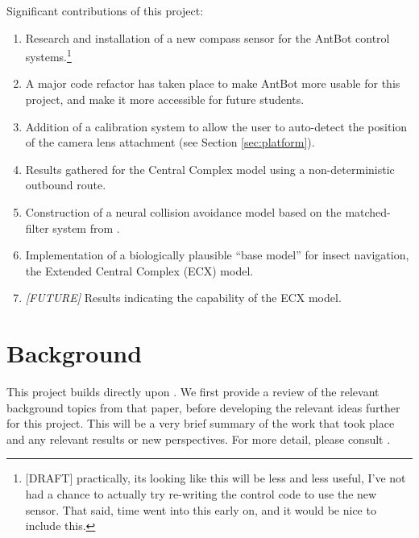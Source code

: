 \documentclass[a4paper,11pt,twoside,openright]{article}
\let\oldsection\section
\def\section{\cleardoublepage\oldsection}
\begin{document}
Significant contributions of this project:
\begin{enumerate}
\item{
  Research and installation of a new compass sensor for the AntBot control
  systems.\footnote{[DRAFT] practically, its looking like this will be less
    and less useful, I've not had a chance to actually try re-writing the control
    code to use the new sensor. That said, time went into this early on, and it
    would be nice to include this.}
}

\item{
  A major code refactor has taken place to make AntBot more usable for this
  project, and make it more accessible for future students.
}

\item{
  Addition of a calibration system to allow the user to auto-detect the position
  of the camera lens attachment (see Section \ref{sec:platform}).
}

\item{
  Results gathered for the Central Complex model using a non-deterministic
  outbound route.
}

\item{ Construction of a neural collision avoidance model based on the
  matched-filter system from \cite{Mitchell2018, Stewart2010}. }

\item{
  Implementation of a biologically plausible ``base model'' for
  insect navigation, the Extended Central Complex (ECX) model.
}

\item{
  \textit{[FUTURE]} Results indicating the capability of the ECX model.
}
\end{enumerate}
\newpage

\section{ Background }
This project builds directly upon \cite{Mitchell2018}. We first provide a review
of the relevant background topics from that paper, before developing the relevant
ideas further for this project. This will be a very brief summary of the work
that took place and any relevant results or new perspectives. For more detail,
please consult \cite{Mitchell2018}.
\end{document}
